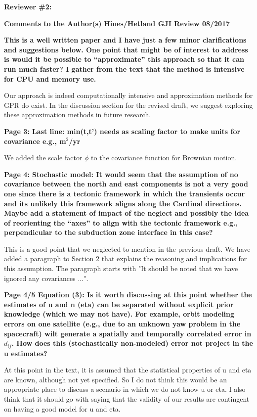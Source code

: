 \documentclass[10pt,a4paper]{letter}
\begin{document}
\begin{letter}{}
\textbf{Reviewer \#2:}\newline

\textbf{Comments to the Author(s)}
\textbf{Hines/Hetland GJI Review 08/2017}

\textbf{This is a well written paper and I have just a few minor
clarifications and suggestions below.  One point that might be of
interest to address is would it be possible to “approximate” this
approach so that it can run much faster?  I gather from the text that
the method is intensive for CPU and memory use.}

Our approach is indeed computationally intensive and approximation
methods for GPR do exist. In the discussion section for the revised
draft, we suggest exploring these approximation methods in future
research. 

\textbf{Page 3: Last line: min(t,t’) needs as scaling factor to make
units for covariance e.g., m$^2$/yr}

We added the scale factor $\phi$ to the covariance function for
Brownian motion.

\textbf{Page 4: Stochastic model: It would seem that the assumption of no
covariance between the north and east components is not a very good
one since there is a tectonic framework in which the transients occur
and its unlikely this framework aligns along the Cardinal directions.
Maybe add a statement of impact of the neglect and possibly the idea
of reorienting the “axes” to align with the tectonic framework e.g.,
perpendicular to the subduction zone interface in this case?}

This is a good point that we neglected to mention in the previous
draft. We have added a paragraph to Section 2 that explains the
reasoning and implications for this assumption. The paragraph starts
with "It should be noted that we have ignored any covariances ...".

\textbf{Page 4/5 Equation (3): Is it worth discussing at this point whether
the estimates of u and n (eta) can be separated without explicit prior
knowledge (which we may not have).  For example, orbit modeling errors
on one satellite (e.g., due to an unknown yaw problem in the
spacecraft) wilt generate a spatially and temporally correlated error
in $d_{ij}$.  How does this (stochastically non-modeled) error not project
in the u estimates?}

At this point in the text, it is assumed that the statistical
properties of u and eta are known, although not yet specified. So I do
not think this would be an appropriate place to discuss a scenario in
which we do not know u or eta. I also think that it should go with
saying that the validity of our results are contingent on having a
good model for u and eta.


\end{letter}
\end{document}
